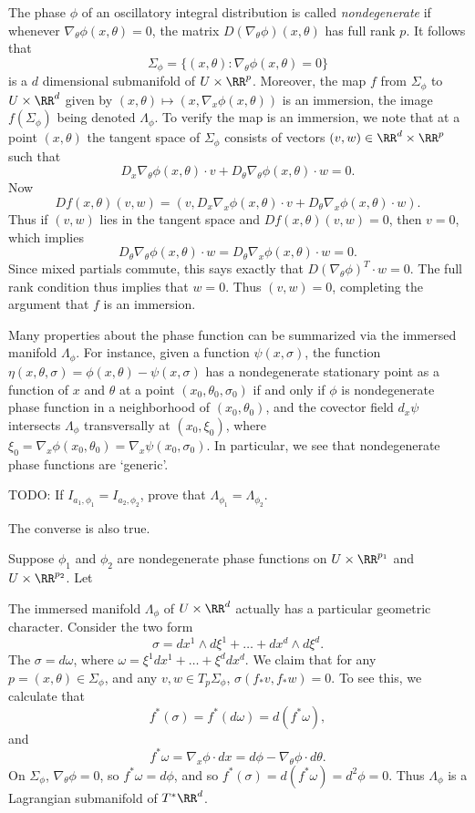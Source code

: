 The phase $\phi$ of an oscillatory integral distribution is called \emph{nondegenerate} if whenever $\nabla_\theta \phi(x,\theta) = 0$, the matrix $D(\nabla_\theta \phi)(x,\theta)$ has full rank $p$. It follows that
%
\[ \Sigma_\phi = \{ (x,\theta): \nabla_\theta \phi(x,\theta) = 0 \} \]
%
is a $d$ dimensional submanifold of $U \times \RR^p$. Moreover, the map $f$ from $\Sigma_\phi$ to $U \times \RR^d$ given by $(x,\theta) \mapsto (x,\nabla_x \phi(x,\theta))$ is an immersion, the image $f(\Sigma_\phi)$ being denoted $\Lambda_\phi$. To verify the map is an immersion, we note that at a point $(x,\theta)$ the tangent space of $\Sigma_\phi$ consists of vectors $(v,w) \in \RR^d \times \RR^p$ such that
%
\[ D_x \nabla_\theta \phi(x,\theta) \cdot v + D_\theta \nabla_\theta \phi(x,\theta) \cdot w = 0. \]
%
Now
%
\[ Df(x,\theta)(v,w) = (v, D_x \nabla_x \phi(x,\theta) \cdot v + D_\theta \nabla_x \phi(x,\theta) \cdot w ). \]
%
Thus if $(v,w)$ lies in the tangent space and $Df(x,\theta)(v,w) = 0$, then $v = 0$, which implies
%
\[ D_\theta \nabla_\theta \phi(x,\theta) \cdot w = D_\theta \nabla_x \phi(x,\theta) \cdot w = 0. \]
%
Since mixed partials commute, this says exactly that $D(\nabla_\theta \phi)^T \cdot w = 0$. The full rank condition thus implies that $w = 0$. Thus $(v,w) = 0$, completing the argument that $f$ is an immersion.

Many properties about the phase function can be summarized via the immersed manifold $\Lambda_\phi$. For instance, given a function $\psi(x,\sigma)$, the function $\eta(x,\theta,\sigma) = \phi(x,\theta) - \psi(x,\sigma)$ has a nondegenerate stationary point as a function of $x$ and $\theta$ at a point $(x_0,\theta_0,\sigma_0)$ if and only if $\phi$ is nondegenerate phase function in a neighborhood of $(x_0,\theta_0)$, and the covector field $d_x \psi$ intersects $\Lambda_\phi$ transversally at $(x_0,\xi_0)$, where $\xi_0 = \nabla_x \phi(x_0,\theta_0) = \nabla_x \psi(x_0,\sigma_0)$. In particular, we see that nondegenerate phase functions are `generic'.

TODO: If $I_{a_1,\phi_1} = I_{a_2,\phi_2}$, prove that $\Lambda_{\phi_1} = \Lambda_{\phi_2}$.

The converse is also true.

\begin{theorem}
    Suppose $\phi_1$ and $\phi_2$ are nondegenerate phase functions on $U \times \RR^{p_1}$ and $U \times \RR^{p_2}$. Let 
\end{theorem}

The immersed manifold $\Lambda_\phi$ of $U \times \RR^d$ actually has a particular geometric character. Consider the two form
%
\[ \sigma = dx^1 \wedge d\xi^1 + \dots + dx^d \wedge d\xi^d. \]
%
The $\sigma = d\omega$, where $\omega = \xi^1 dx^1 + \dots + \xi^d dx^d$. We claim that for any $p =(x,\theta) \in \Sigma_\phi$, and any $v,w \in T_p \Sigma_\phi$, $\sigma(f_* v, f_* w) = 0$. To see this, we calculate that
%
\[ f^*(\sigma) = f^*(d \omega) = d(f^* \omega), \]
%
and
%
\[ f^* \omega = \nabla_x \phi \cdot dx = d \phi - \nabla_\theta \phi \cdot d\theta. \]
%
On $\Sigma_\phi$, $\nabla_\theta \phi = 0$, so $f^* \omega = d \phi$, and so $f^*(\sigma) = d(f^* \omega) = d^2 \phi = 0$. Thus $\Lambda_\phi$ is a Lagrangian submanifold of $T^* \RR^d$.

